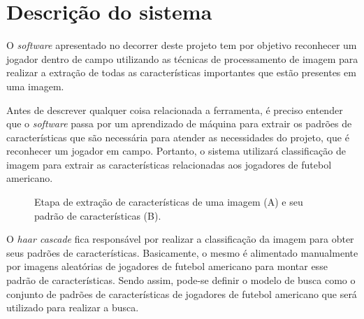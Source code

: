 \section{\textbf{Descrição do sistema}}
\label{descricao-do-sistema}


O \textit{software} apresentado no decorrer deste projeto tem por objetivo reconhecer um jogador dentro de campo utilizando as técnicas de processamento de imagem para realizar a extração de todas as características importantes que estão presentes em uma imagem.

Antes de descrever qualquer coisa relacionada a ferramenta, é preciso entender que o \textit{software} passa por um aprendizado de máquina para extrair os padrões de características que são necessária para atender as necessidades do projeto, que é reconhecer um jogador em campo. Portanto, o sistema utilizará classificação de imagem para extrair as características relacionadas aos jogadores de futebol americano.

\begin{figure}[h]
	\caption{\label{fig_conversao_img}Etapa de extração de características de uma imagem (A) e seu padrão de características (B).}
	\begin{center}
	\end{center}
	\centering {}
\end{figure}

O \textit{haar cascade} fica responsável por realizar a classificação da imagem para obter seus padrões de características. Basicamente, o mesmo é alimentado manualmente por imagens aleatórias de jogadores de futebol americano para montar esse padrão de características. Sendo assim, pode-se definir o modelo de busca como o conjunto de padrões de características de jogadores de futebol americano que será utilizado para realizar a busca.

